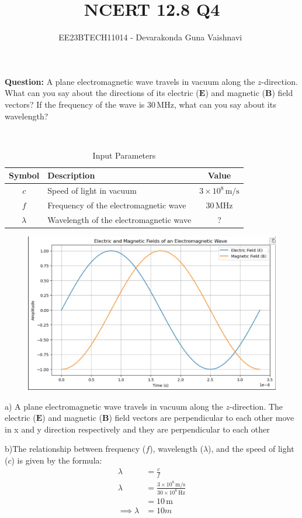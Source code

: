 \documentclass[a4,12pt,onecolumn]{IEEEtran}
\begin{document}
\title{NCERT 12.8 Q4}
\author{EE23BTECH11014 - Devarakonda Guna Vaishnavi $^{}$}
\textbf{Question:} A plane electromagnetic wave travels in vacuum along the \(z\)-direction. What can you say about the directions of its electric (\(\mathbf{E}\)) and magnetic (\(\mathbf{B}\)) field vectors? If the frequency of the wave is \(30 \, \text{MHz}\), what can you say about its wavelength?
 

\solution\\
\fi
\begin{table}[h]
    \centering
    \begin{tabular}{|c|l|c|}
\hline
Symbol & Description                               & Value                    \\ 
\hline
\(c\)    & Speed of light in vacuum                  & \(3 \times 10^8 \, \text{m/s}\) \\
\hline
\(f\)    & Frequency of the electromagnetic wave    & \(30 \, \text{MHz}\)     \\
\hline
\(\lambda\) & Wavelength of the electromagnetic wave   & ?                        \\ \hline
\end{tabular}
    \caption{Input Parameters}
\end{table}

\begin{figure}[h!]
	\centering
	\includegraphics[width=\columnwidth]{ ncert-physics/12/8/4/figs/emplot.jpeg}
\end{figure}
 a) A plane electromagnetic wave travels in vacuum along the \(z\)-direction. The electric (\(\mathbf{E}\)) and magnetic (\(\mathbf{B}\)) field vectors are perpendicular to each other move in x and y direction respectively and they are perpendicular to each other
 \vspace{0.2cm}

 b)The relationship between frequency (\(f\)), wavelength (\(\lambda\)), and the speed of light (\(c\)) is given by the formula:
\begin{align}
        \lambda &= \frac{c}{f}\\
        \lambda &= \frac{3 \times 10^8 \, \text{m/s}}{30 \times 10^6 \, \text{Hz}} \\
        &= 10 \, \text{m}\\
\implies \lambda &= 10m  
   \end{align}
\end{document}
